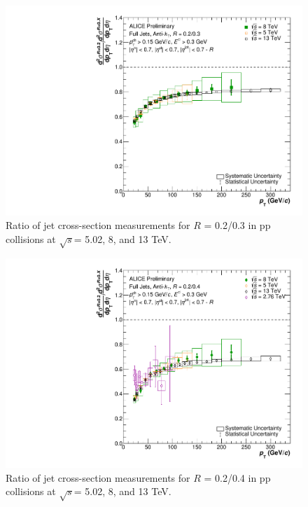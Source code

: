 \documentclass[ALICE]{ALICE_analysis_notes}
\newcommand{\s}{$\sqrt{s}$\xspace}
\newcommand{\pp}{pp\xspace}
\begin{document}
\begin{appendix}
\begin{figure}[h!]
    \centering
    \includegraphics[width=15cm]{figures/EnergyComparisons/RatioComparison_R03.pdf}
    \caption{Ratio of jet cross-section measurements for $R$ = 0.2/0.3 in \pp collisions at \s = 5.02, 8, and 13 TeV.}
    \label{fig:appRatioCompareR03}
\end{figure}

\begin{figure}[h!]
    \centering
    \includegraphics[width=15cm]{figures/EnergyComparisons/RatioComparison_R04.pdf}
    \caption{Ratio of jet cross-section measurements for $R$ = 0.2/0.4 in \pp collisions at \s = 5.02, 8, and 13 TeV.}
    \label{fig:appRatioCompareR04}
\end{figure}


\end{appendix}
\end{document}
